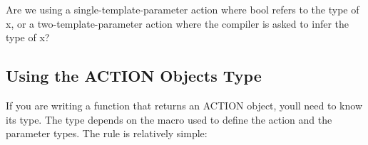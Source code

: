\begin{DoxyCode}{0}
\end{DoxyCode}


Are we using a single-\/template-\/parameter action where {\ttfamily bool} refers to the type of {\ttfamily x}, or a two-\/template-\/parameter action where the compiler is asked to infer the type of {\ttfamily x}?

\subsection*{Using the A\+C\+T\+I\+ON Object\textquotesingle{}s Type}

If you are writing a function that returns an {\ttfamily A\+C\+T\+I\+ON} object, you\textquotesingle{}ll need to know its type. The type depends on the macro used to define the action and the parameter types. The rule is relatively simple\+:

